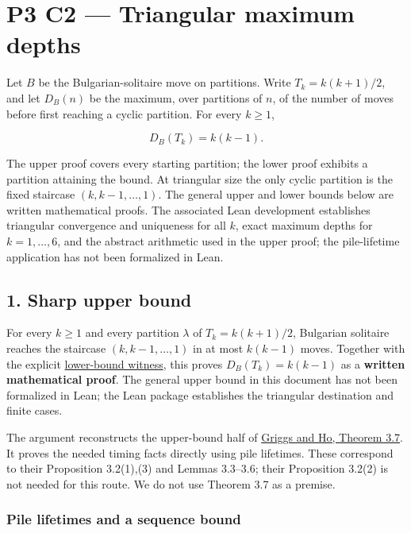 \documentclass[11pt,a4paper]{article}
\begin{document}
\section{P3 C2 --- Triangular maximum depths}\label{p3-c2-triangular-maximum-depths}

Let \(B\) be the Bulgarian-solitaire move on partitions. Write \(T_k=k(k+1)/2\), and let \(D_B(n)\) be the maximum, over partitions of \(n\), of the number of moves before first reaching a cyclic partition. For every \(k\ge1\),

\[
\boxed{D_B(T_k)=k(k-1).}
\]

The upper proof covers every starting partition; the lower proof exhibits a partition attaining the bound. At triangular size the only cyclic partition is the fixed staircase \((k,k-1,\ldots,1)\). The general upper and lower bounds below are written mathematical proofs. The associated Lean development establishes triangular convergence and uniqueness for all \(k\), exact maximum depths for \(k=1,\ldots,6\), and the abstract arithmetic used in the upper proof; the pile-lifetime application has not been formalized in Lean.

\subsection{1. Sharp upper bound}\label{sharp-upper-bound}

For every \(k\ge1\) and every partition \(\lambda\) of \(T_k=k(k+1)/2\), Bulgarian solitaire reaches the staircase \((k,k-1,\ldots,1)\) in at most \(k(k-1)\) moves. Together with the explicit \href{https://github.com/mpelteshki/climbing-to-the-frontier/blob/212bba53b1818c08c40b8c4b48f636651eaf6410/cagent/p3/c2/lower-bound-proof.md}{lower-bound witness}, this proves \(D_B(T_k)=k(k-1)\) as a \textbf{written mathematical proof}. The general upper bound in this document has not been formalized in Lean; the Lean package establishes the triangular destination and finite cases.

The argument reconstructs the upper-bound half of \href{https://sc.edu/study/colleges_schools/artsandsciences/mathematics/research/imi/research/documents/1998/1998_12.pdf}{Griggs and Ho, Theorem 3.7}. It proves the needed timing facts directly using pile lifetimes. These correspond to their Proposition 3.2(1),(3) and Lemmas 3.3--3.6; their Proposition 3.2(2) is not needed for this route. We do not use Theorem 3.7 as a premise.

\subsubsection{Pile lifetimes and a sequence bound}\label{pile-lifetimes-and-a-sequence-bound}
\end{document}
